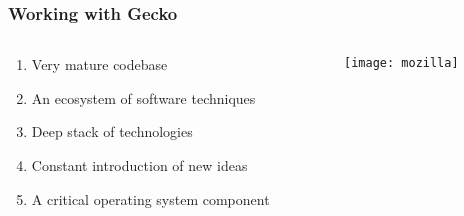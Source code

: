 \documentclass[
	notes=none,
	aspectratio=169
]{beamer}
\begin{document}

\begin{frame}
\frametitle{}

\begin{columns}[T]
\begin{column}[T]{0.5\textwidth}
\setlength{\parskip}{0.5em}

\vspace{0.5cm}





\end{column}
\begin{column}[T]{0.5\textwidth}
\setlength{\parskip}{0.5em}

\vspace{0.5cm}



\end{column}
\end{columns}

\end{frame}
\note{
\begin{enumerate}
\item -
\end{enumerate}
}


\begin{frame}
\frametitle{Working with Gecko}

\begin{columns}[T]
\begin{column}[T]{0.5\textwidth}
\setlength{\parskip}{0.5em}

\vspace{1.2cm}
\begin{enumerate}
\setlength{\parskip}{0.5em}
\item Very mature codebase
\item An ecosystem of software techniques
\item Deep stack of technologies
\item Constant introduction of new ideas
\item A critical operating system component
\end{enumerate}

\end{column}
\begin{column}[T]{0.5\textwidth}
\setlength{\parskip}{0.5em}

\vspace{0.5cm}
\texttt{[image: mozilla]}

\end{column}
\end{columns}

\end{frame}
\note{
\begin{enumerate}
\item -
\end{enumerate}
}
\end{document}
